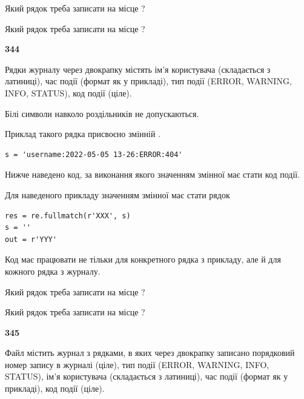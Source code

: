 Який рядок треба записати на місце  ?\par
\vspace{5mm}


Який рядок треба записати на місце  ?\par


\newpage

{\begin {center}\textbf{ 344}\end {center}}\par
Рядки журналу через двокрапку містять ім'я користувача (складається з латиниці), час події (фор\-мат як у прикладі), тип події (ERROR, WARNING, INFO, STATUS), код події (ціле).

Білі символи навколо роздільників не допускаються.

Приклад такого рядка присвоєно змінній .



\begin{verbatim}
s = 'username:2022-05-05 13-26:ERROR:404'
\end{verbatim}


Нижче наведено код, за виконання якого значенням змінної  має стати код події.

Для наведеного прикладу значенням змінної  має стати рядок 



\begin{verbatim}
res = re.fullmatch(r'XXX', s)
s = ''
out = r'YYY'
\end{verbatim}


Код має працювати не тільки для конкретного рядка з прикладу, але й для кожного рядка з журналу.




Який рядок треба записати на місце  ?\par
\vspace{5mm}


Який рядок треба записати на місце  ?\par


\newpage

{\begin {center}\textbf{ 345}\end {center}}\par
Файл  містить журнал з рядками, в яких через двокрапку записано поряд\-ко\-вий номер запису в журналі (ціле), тип події (ERROR, WARNING, INFO, STATUS), ім'я користувача (складається з латиниці), час події (фор\-мат як у прикладі), код події (ціле).


